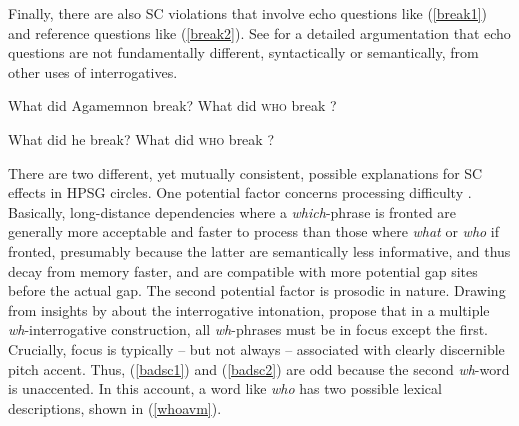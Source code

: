 \documentclass[output=paper
 	        ,biblatex
                ,babelshorthands
                ,newtxmath
                ,draftmode
                ,colorlinks, citecolor=brown
]{langscibook}
\begin{document}
\noindent 
Finally, there are also SC violations that involve echo questions like (\ref{break1}) and reference
questions like (\ref{break2}). See \citet[Chapter 7]{ginzsag} for a detailed argumentation that echo
questions are not fundamentally different, syntactically or semantically, from other uses of
interrogatives.

\eal \label{break1}
\ex What did Agamemnon break?
\ex What did \textsc{who} break \spc?
\zl

\eal  \label{break2}
\ex What did he break?
\ex What did \textsc{who} break \spc?
\zl

There are two different, yet mutually consistent, possible explanations for SC effects in HPSG
circles.  One potential factor concerns processing difficulty \citep{arnon07}. Basically,
long-distance dependencies where a \emph{which}-phrase is fronted are generally more acceptable and
faster to process than those where \emph{what} or \emph{who} if fronted, presumably because the
latter are semantically less informative, and thus decay from memory faster, and are compatible with
more potential gap sites before the actual gap.  The second potential factor is prosodic in
nature. Drawing from insights by \citet[170--172]{Ladd96} about the  interrogative
intonation, \citet[251]{ginzsag} propose that in a multiple \emph{wh}-interrogative construction,
all \emph{wh}-phrases must be in focus except the first. Crucially, focus is typically -- but not
always -- associated with clearly discernible pitch accent. Thus, (\ref{badsc1}) and (\ref{badsc2})
are odd because the second \emph{wh}-word is unaccented. In this account, a word like \emph{who}
has two possible lexical descriptions, shown in (\ref{whoavm}).


\eal \label{whoavm}
\end{document}
